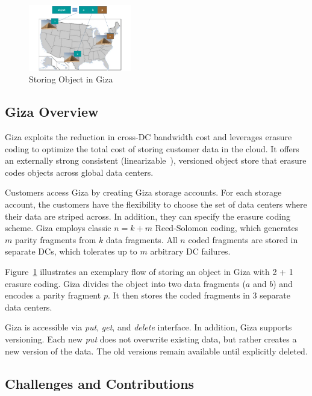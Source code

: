 \begin{figure}[tp]
\centering
\includegraphics[width=0.4\textwidth]{images/giza_example_crop_fit}
\caption{Storing Object in Giza}
\label{fig:giza_example}
\end{figure}

\subsection{Giza Overview}

Giza exploits the reduction in cross-DC bandwidth cost and leverages erasure coding to optimize the total cost of storing customer data in the cloud. It offers an externally strong consistent (linearizable~\cite{herlihy90linearizability}), versioned object store that erasure codes objects across global data centers.

Customers access Giza by creating Giza storage accounts. For each storage account, the customers have the flexibility to choose the set of data centers where their data are striped across. In addition, they can specify the erasure coding scheme. Giza employs classic $n = k + m$ Reed-Solomon coding, which generates $m$ parity fragments from $k$ data fragments. All $n$ coded fragments are stored in separate DCs, which tolerates up to $m$ arbitrary DC failures.

Figure~\ref{fig:giza_example} illustrates an exemplary flow of storing an object in Giza with 2 + 1 erasure coding. Giza divides the object into two data fragments ($a$ and $b$) and encodes a parity fragment $p$. It then stores the coded fragments in $3$ separate data centers. 

Giza is accessible via {\em put}, {\em get}, and {\em delete} interface. In addition, Giza supports versioning. Each new {\em put} does not overwrite existing data, but rather creates a new version of the data. The old versions remain available until explicitly deleted.

\subsection{Challenges and Contributions}

